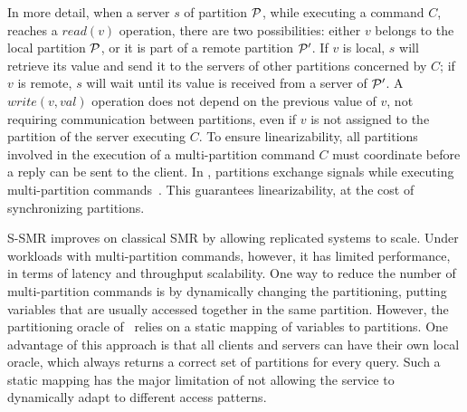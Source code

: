 %


In more detail, when a server $s$ of partition $\mathcal{P}$, while executing a command $C$, reaches a $read(v)$ operation, there are two possibilities:
either $v$ belongs to the local partition $\mathcal{P}$,
or it is part of a remote partition $\mathcal{P}'$. 
If $v$ is local, $s$ will retrieve its value and send it to the servers of other partitions concerned by $C$;
if $v$ is remote, $s$ will wait until its value is received from a server of $\mathcal{P}'$. 
A $write(v, val)$ operation does not depend on the previous value of $v$, not requiring communication between partitions, even if $v$ is not assigned to the partition of the server executing $C$.
To ensure linearizability, all partitions involved in the execution of a multi-partition command $C$ must coordinate before a reply can be sent to the client.
In \ssmr{}, partitions exchange signals while executing multi-partition commands~\cite{bezerra2014ssmr}.
This guarantees linearizability, at the cost of synchronizing partitions.

S-SMR improves on classical SMR by allowing replicated systems to scale. 
Under workloads with multi-partition commands, however, it has limited performance, in terms of latency and throughput scalability. 
%
One way to reduce the number of multi-partition commands is by dynamically changing the partitioning, putting variables that are usually accessed together in the same partition.
However, the partitioning oracle of \ssmr\ relies on a static mapping of variables to partitions.
One advantage of this approach is that all clients and servers can have their own local oracle, which always returns a correct set of partitions for every query.
Such a static mapping has the major limitation of not allowing the service to dynamically adapt to different access patterns.

